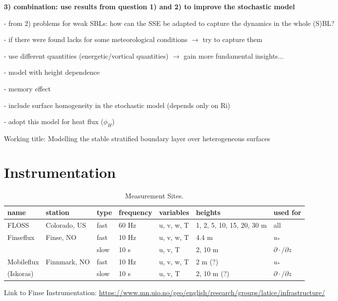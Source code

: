 \documentclass[11pt]{article}
\begin{document}
	\textbf{3) combination: use results from question 1) and 2) to improve the stochastic model}
	\begin{compactenum}
		\item[-] from 2) problems for weak SBLs: how can the SSE be adapted to capture the dynamics in the whole (S)BL?
		\item[-] if there were found lacks for some meteorological conditions $\rightarrow$ try to capture them
		\item[-] use different quantities (energetic/vortical quantities) $\rightarrow$ gain more fundamental insights...
		\item[-] model with height dependence
		\item[-] memory effect
		\item[-] include surface homogeneity \citep{Stiperski2018,Stiperski2019} in the stochastic model (depends only on Ri) 
		\item[-] adopt this model for heat flux ($\phi_H$)
	\end{compactenum}
	
	Working title: Modelling the stable stratified boundary layer over heterogeneous surfaces
	
	\newpage
	\section{Instrumentation}
	\begin{table}[H]
		\begin{tabular}{lllllll}
			\textbf{name} & \textbf{station} & \textbf{type} & \textbf{frequency} & \textbf{variables} & \textbf{heights} & \textbf{used for} \\
			\hline
			FLOSS & Colorado, US & fast & 60 Hz & u, v, w, T & 1, 2, 5, 10, 15, 20, 30 m& all\\
			\hline
			Finseflux & Finse, NO & fast & 10 Hz & u, v, w, T& 4.4 m & $ u_*$ \\
			&&slow & 10 s & u, v, T & 2, 10 m & $ \partial \cdot / \partial z$ \\
			\hline
			Mobileflux &Finnmark, NO &fast & 10 Hz & u, v, w, T& 2 m (?) & $ u_*$ \\
			(Iskoras) &&slow & 10 s & u, v, T & 2, 10 m (?) & $ \partial \cdot / \partial z$ \\
			\hline		
		\end{tabular}
		\caption{Measurement Sites.}
	\end{table}
	

Link to Finse Instrumentation: \url{https://www.mn.uio.no/geo/english/research/groups/latice/infrastructure/} \\
\end{document}
